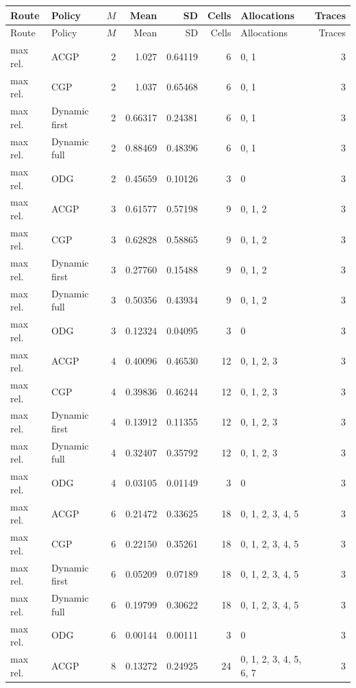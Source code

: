 \documentclass[10pt,a4paper]{article}
\begin{document}
\tiny\setlength{\tabcolsep}{2pt}\begin{longtable}{@{}p{23mm}p{29mm}rrrrp{36mm}r@{}}
\toprule Route & Policy & $M$ & Mean & SD & Cells & Allocations & Traces \\ \midrule\endfirsthead
\toprule Route & Policy & $M$ & Mean & SD & Cells & Allocations & Traces \\ \midrule\endhead
\bottomrule\endfoot
max rel. & ACGP & 2 & 1.027 & 0.64119 & 6 & 0, 1 & 3 \\
max rel. & CGP & 2 & 1.037 & 0.65468 & 6 & 0, 1 & 3 \\
max rel. & Dynamic first & 2 & 0.66317 & 0.24381 & 6 & 0, 1 & 3 \\
max rel. & Dynamic full & 2 & 0.88469 & 0.48396 & 6 & 0, 1 & 3 \\
max rel. & ODG & 2 & 0.45659 & 0.10126 & 3 & 0 & 3 \\
max rel. & ACGP & 3 & 0.61577 & 0.57198 & 9 & 0, 1, 2 & 3 \\
max rel. & CGP & 3 & 0.62828 & 0.58865 & 9 & 0, 1, 2 & 3 \\
max rel. & Dynamic first & 3 & 0.27760 & 0.15488 & 9 & 0, 1, 2 & 3 \\
max rel. & Dynamic full & 3 & 0.50356 & 0.43934 & 9 & 0, 1, 2 & 3 \\
max rel. & ODG & 3 & 0.12324 & 0.04095 & 3 & 0 & 3 \\
max rel. & ACGP & 4 & 0.40096 & 0.46530 & 12 & 0, 1, 2, 3 & 3 \\
max rel. & CGP & 4 & 0.39836 & 0.46244 & 12 & 0, 1, 2, 3 & 3 \\
max rel. & Dynamic first & 4 & 0.13912 & 0.11355 & 12 & 0, 1, 2, 3 & 3 \\
max rel. & Dynamic full & 4 & 0.32407 & 0.35792 & 12 & 0, 1, 2, 3 & 3 \\
max rel. & ODG & 4 & 0.03105 & 0.01149 & 3 & 0 & 3 \\
max rel. & ACGP & 6 & 0.21472 & 0.33625 & 18 & 0, 1, 2, 3, 4, 5 & 3 \\
max rel. & CGP & 6 & 0.22150 & 0.35261 & 18 & 0, 1, 2, 3, 4, 5 & 3 \\
max rel. & Dynamic first & 6 & 0.05209 & 0.07189 & 18 & 0, 1, 2, 3, 4, 5 & 3 \\
max rel. & Dynamic full & 6 & 0.19799 & 0.30622 & 18 & 0, 1, 2, 3, 4, 5 & 3 \\
max rel. & ODG & 6 & 0.00144 & 0.00111 & 3 & 0 & 3 \\
max rel. & ACGP & 8 & 0.13272 & 0.24925 & 24 & 0, 1, 2, 3, 4, 5, 6, 7 & 3 \\

\end{longtable}
\end{document}
